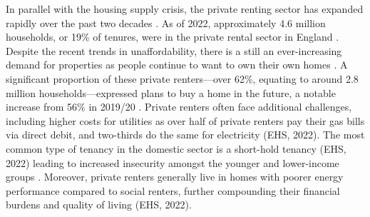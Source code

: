 In parallel with the housing supply crisis, the private renting sector has expanded rapidly over the past two decades \cite{field_reappraising_2014, bailey_poverty_2020}. As of 2022, approximately 4.6 million households, or 19\% of tenures, were in the private rental sector in England \cite{department_for_levelling_up_housing_and_communities_dluhc_english_2022}. Despite the recent trends in unaffordability, there is a still an ever-increasing demand for properties as people continue to want to own their own homes \cite{aldridge_housing_2018}. A significant proportion of these private renters—over 62\%, equating to around 2.8 million households—expressed plans to buy a home in the future, a notable increase from 56\% in 2019/20 \cite{department_for_levelling_up_housing_and_communities_dluhc_english_2022}. Private renters often face additional challenges, including higher costs for utilities as over half of private renters pay their gas bills via direct debit, and two-thirds do the same for electricity (EHS, 2022). The most common type of tenancy in the domestic sector is a short-hold tenancy (EHS, 2022) leading to increased insecurity amongst the younger and lower-income groups \cite{mckee_generation_2020}. Moreover, private renters generally live in homes with poorer energy performance compared to social renters, further compounding their financial burdens and quality of living (EHS, 2022). \\


